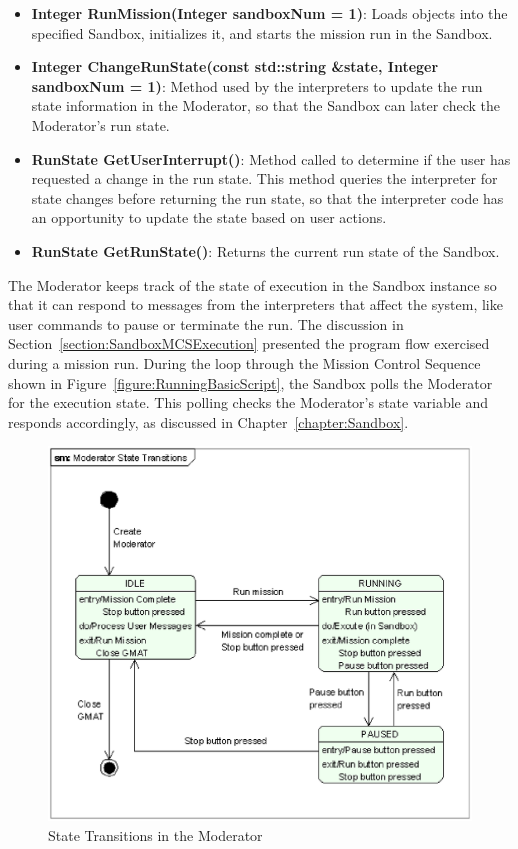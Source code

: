 \begin{itemize}
\item \textbf{Integer RunMission(Integer sandboxNum = 1)}:  Loads objects into the specified
Sandbox, initializes it, and starts the mission run in the Sandbox.
\item \textbf{Integer ChangeRunState(const std::string \&state, Integer sandboxNum = 1)}: 
Method used by the interpreters to update the run state information in the Moderator, so that the
Sandbox can later check the Moderator's run state.
\item \textbf{RunState GetUserInterrupt()}:  Method called to determine if the user has requested a
change in the run state.  This method queries the interpreter for state changes before returning
the run state, so that the interpreter code has an opportunity to update the state based on user
actions.
\item \textbf{RunState GetRunState()}:  Returns the current run state of the Sandbox.
\end{itemize}

The Moderator keeps track of the state of execution in the Sandbox instance so that it can respond
to messages from the interpreters that affect the system, like user commands to pause or terminate
the run.  The discussion in Section~\ref{section:SandboxMCSExecution} presented the program flow
exercised during a mission run.  During the loop through the Mission Control Sequence shown in
Figure~\ref{figure:RunningBasicScript}, the Sandbox polls the Moderator for the execution state.
This polling checks the Moderator's state variable and responds accordingly, as discussed in
Chapter~\ref{chapter:Sandbox}.

\begin{figure}[htb]
\begin{center}
\includegraphics[scale=0.5]{Images/ModeratorStateTransitions.eps}
\caption{State Transitions in the Moderator}
\label{figure:ModeratorStateTransitions}
\end{center}
\end{figure}

